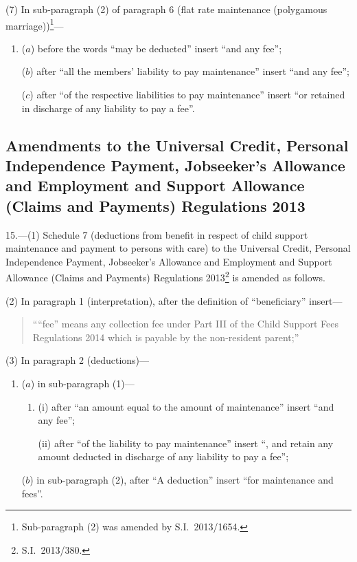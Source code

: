 \documentclass[12pt,a4paper]{article}
\begin{document}
(7) In sub-paragraph (2) of paragraph 6 (flat rate maintenance (polygamous marriage))\footnote{Sub-paragraph (2) was amended by S.I.~2013/1654.}—
\begin{enumerate}\item[]
($a$) before the words “may be deducted” insert “and any fee”;

($b$) after “all the members’ liability to pay maintenance” insert “and any fee”;

($c$) after “of the respective liabilities to pay maintenance” insert “or retained in discharge of any liability to pay a fee”.
\end{enumerate}

\subsection[15. Amendments to the Universal Credit, Personal Independence Payment, Jobseeker’s Allowance and Employment and Support Allowance (Claims and Payments) Regulations 2013]{\sloppy Amendments to the Universal Credit, Personal Independence Payment, Jobseeker’s Allowance and Employment and Support Allowance (Claims and Payments) Regulations 2013}

15.—(1) Schedule 7 (deductions from benefit in respect of child support maintenance and payment to persons with care) to the Universal Credit, Personal Independence Payment, Jobseeker’s Allowance and Employment and Support Allowance (Claims and Payments) Regulations 2013\footnote{S.I.~2013/380.} is amended as follows.

(2) In paragraph 1 (interpretation), after the definition of “beneficiary” insert—
\begin{quotation}
““fee” means any collection fee under Part III of the Child Support Fees Regulations 2014 which is payable by the non-resident parent;”
\end{quotation}

(3) In paragraph 2 (deductions)—
\begin{enumerate}\item[]
($a$) in sub-paragraph (1)—
\begin{enumerate}\item[]
(i) after “an amount equal to the amount of maintenance” insert “and any fee”;

(ii) after “of the liability to pay maintenance” insert “, and retain any amount deducted in discharge of any liability to pay a fee”;
\end{enumerate}

($b$) in sub-paragraph (2), after “A deduction” insert “for maintenance and fees”.
\end{enumerate}
\end{document}
